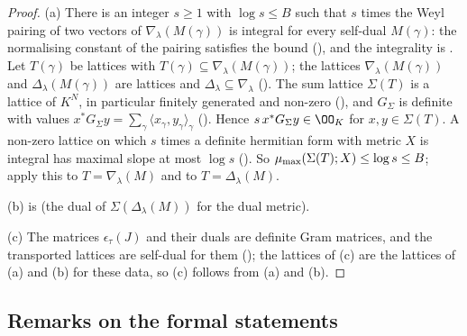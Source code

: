 \begin{proof}
(a) There is an integer $s\ge1$ with $\log s\le B$ such that $s$ times the Weyl pairing of two vectors of
$\nabla_\lambda(M(\gamma))$ is integral for every self-dual $M(\gamma)$: the normalising constant of the pairing satisfies the
bound (), and the integrality is
. Let $T(\gamma)$ be lattices with
$T(\gamma)\subseteq\nabla_\lambda(M(\gamma))$; the lattices $\nabla_\lambda(M(\gamma))$ and $\Delta_\lambda(M(\gamma))$ are lattices
and $\Delta_\lambda\subseteq\nabla_\lambda$ (). The sum lattice
$\Sigma(T)$ is a lattice of $K^N$, in particular finitely generated and non-zero
(), and $G_\Sigma$ is definite with values
$x^*G_\Sigma y=\sum_\gamma\langle x_\gamma,y_\gamma\rangle_\gamma$ ().
Hence $s\,x^*G_\Sigma y\in\OO_K$ for $x,y\in\Sigma(T)$. A non-zero lattice on which $s$ times a definite hermitian form with metric
$X$ is integral has maximal slope at most $\log s$ (). So
$\mu_{\max}(\Sigma(T);X)\le\log s\le B$; apply this to $T=\nabla_\lambda(M)$ and to $T=\Delta_\lambda(M)$.

(b) is  (the dual of $\Sigma(\Delta_\lambda(M))$ for the dual metric).

(c) The matrices $\epsilon_\tau(J)$ and their duals are definite Gram matrices, and the transported lattices are self-dual for
them (); the lattices of (c) are the lattices of (a) and (b)
for these data, so (c) follows from (a) and (b).
\end{proof}

\subsection{Remarks on the formal statements}\label{sec:pf:fit:remarks}

